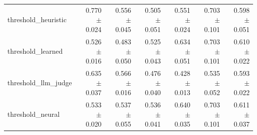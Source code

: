 \begin{table}[t]
\begin{tabular}{lrrrrrr}
threshold\_heuristic & 0.770 $\pm$ 0.024 & 0.556 $\pm$ 0.045 & 0.505 $\pm$ 0.051 & 0.551 $\pm$ 0.024 & 0.703 $\pm$ 0.101 & 0.598 $\pm$ 0.051 \\
threshold\_learned & 0.526 $\pm$ 0.016 & 0.483 $\pm$ 0.050 & 0.525 $\pm$ 0.043 & 0.634 $\pm$ 0.051 & 0.703 $\pm$ 0.101 & 0.610 $\pm$ 0.022 \\
threshold\_llm\_judge & 0.635 $\pm$ 0.037 & 0.566 $\pm$ 0.016 & 0.476 $\pm$ 0.040 & 0.428 $\pm$ 0.013 & 0.535 $\pm$ 0.052 & 0.593 $\pm$ 0.022 \\
threshold\_neural & 0.533 $\pm$ 0.020 & 0.537 $\pm$ 0.055 & 0.536 $\pm$ 0.041 & 0.640 $\pm$ 0.035 & 0.703 $\pm$ 0.101 & 0.611 $\pm$ 0.037 \\
\bottomrule
\end{tabular}
\end{table}
